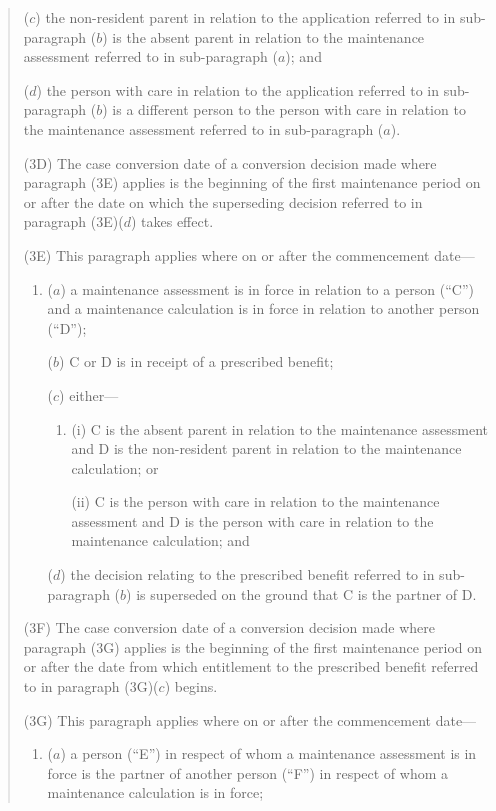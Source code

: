 \documentclass[12pt,a4paper]{article}
\begin{document}
\begin{enumerate}
\begin{quotation}
\begin{enumerate}
($c$) the non-resident parent in relation to the application referred to in sub-paragraph ($b$)  is the absent parent in relation to the maintenance assessment referred to in sub-paragraph ($a$); and

($d$) the person with care in relation to the application referred to in sub-paragraph ($b$)  is a different person to the person with care in relation to the maintenance assessment referred to in sub-paragraph ($a$).
\end{enumerate}

(3D) The case conversion date of a conversion decision made where paragraph (3E) applies is the beginning of the first maintenance period on or after the date on which the superseding decision referred to in paragraph (3E)($d$)  takes effect.

(3E) This paragraph applies where on or after the commencement date—
\begin{enumerate}\item[]
($a$) a maintenance assessment is in force in relation to a person (“C”) and a maintenance calculation is in force in relation to another person (“D”);

($b$) C or D is in receipt of a prescribed benefit;

($c$) either—
\begin{enumerate}\item[]
(i) C is the absent parent in relation to the maintenance assessment and D is the non-resident parent in relation to the maintenance calculation; or

(ii) C is the person with care in relation to the maintenance assessment and D is the person with care in relation to the maintenance calculation; and
\end{enumerate}

($d$) the decision relating to the prescribed benefit referred to in sub-paragraph ($b$)  is superseded on the ground that C is the partner of D.
\end{enumerate}

(3F) The case conversion date of a conversion decision made where paragraph (3G) applies is the beginning of the first maintenance period on or after the date from which entitlement to the prescribed benefit referred to in paragraph (3G)($c$)  begins.

(3G) This paragraph applies where on or after the commencement date—
\begin{enumerate}\item[]
($a$) a person (“E”) in respect of whom a maintenance assessment is in force is the partner of another person (“F”) in respect of whom a maintenance calculation is in force;


\end{enumerate}
\end{quotation}
\end{enumerate}
\end{document}
